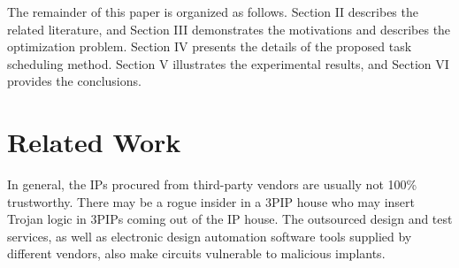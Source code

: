 \documentclass[10pt,journal, compsoc]{IEEEtran}
\begin{document}
The remainder of this paper is organized as follows. Section II describes the related literature, and Section III demonstrates the motivations and describes the optimization problem. Section IV presents the details of the proposed task scheduling method. Section V illustrates the experimental results, and Section VI provides the conclusions.







\section{Related Work}




In general, the IPs procured from third-party vendors are usually not 100\% trustworthy. There may be a rogue insider in a 3PIP house who may insert Trojan logic in 3PIPs coming out of the IP house. The outsourced design and test services, as well as electronic design automation software tools supplied by different vendors, also make circuits vulnerable to malicious implants.%










\end{document}
